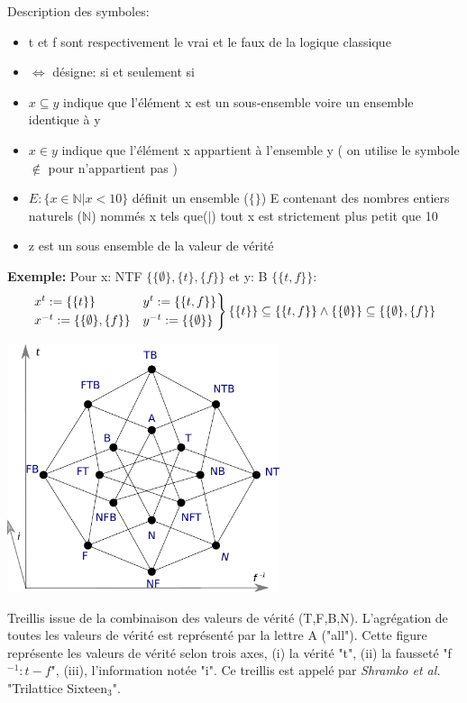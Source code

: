 \begin{refsegment}
    Description des symboles:\nolisttopbreak
    \begin{itemize}
        \item t et f sont respectivement le vrai et le faux de la logique classique
        \item $\iff$ désigne: si et seulement si
        \item $x \subseteq y$  indique que  l'élément x est un sous-ensemble voire un ensemble identique à y
        \item $x \in y$ indique que l'élément x appartient à l'ensemble y ( on utilise le symbole  $\notin$ pour n'appartient pas )
        \item $E : \{ x \in \mathbb{N} | x < 10 \}$ définit un ensemble ($\{\}$) E contenant des nombres entiers naturels ($\mathbb{N}$) nommés x tels que($|$) tout x est strictement plus petit que 10
        \item z est un sous ensemble de la valeur de vérité
    \end{itemize}

    \textbf{Exemple:} Pour x: NTF $\{\{\emptyset\},\{t\},\{f\}\}$ et y: B $\{\{t,f\}\}$:\nolisttopbreak \vspace{-0.5cm}
    \begin{equation*}
    \begin{rcases}
    x^{t}  := \{ \{t\} \}               &y^{t}  := \{ \{t,f\} \}\\
    x^{-t} := \{\{\emptyset\},\{f\} \}  &y^{-t} := \{ \{\emptyset\} \} \\
    \end{rcases}
     \{ \{t\} \} \subseteq \{ \{t,f\} \} \land \{ \{\emptyset\} \} \subseteq \{\{\emptyset\},\{f\} \}
    \end{equation*}


    \begin{shadedfigure}[H]
        \centering
        \includegraphics[width=0.6\textwidth]{img/Generalized_Truth_Values_and_Multilattices.pdf}
        \caption{ Treillis issue de la combinaison des valeurs de vérité (T,F,B,N). L'agrégation de toutes les valeurs de vérité est représenté par la lettre A ("all"). Cette figure représente les valeurs de vérité selon trois axes, (i) la vérité "t", (ii) la fausseté "f$^{-1}: t -f $", (iii), l'information notée "i". Ce treillis est appelé par \textit{Shramko et al.} "Trilattice Sixteen$_{3}$".  }
        \label{fig:sixteen_truth_values}
    \end{shadedfigure}


\end{refsegment}
